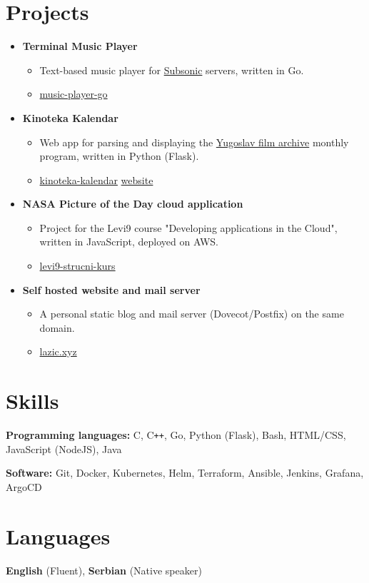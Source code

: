 \documentclass[11pt,a4paper,roman]{moderncv}        %
\begin{document}
\section{Projects}
\begin{itemize}[topsep=0em, itemsep=0pt, itemindent=-1em,font=\huge]
	\item[] \textbf{Terminal Music Player}
		\begin{itemize}[noitemsep,itemindent=-1.25em,topsep=0pt]
			\item[] Text-based music player for \href{http://www.subsonic.org}{Subsonic} servers, written in Go.
			\item[] \faGithub \href{https://github.com/vojislav/music-player-go/}{ music-player-go}
	 	\end{itemize}

	\item[] \textbf{Kinoteka Kalendar}
		\begin{itemize}[noitemsep,itemindent=-1.25em,topsep=0pt]
			\item[] Web app for parsing and displaying the \href{http://kinoteka.org.rs}{Yugoslav film archive} monthly program, written in Python (Flask).
			\item[] \faGithub \href{https://github.com/vojislav/kinoteka-kalendar}{ kinoteka-kalendar} \faGlobe \href{https://kinoteka.lazic.xyz}{ website}
	 	\end{itemize}

	 \item[] \textbf{NASA Picture of the Day cloud application}
	 	\begin{itemize}[noitemsep,itemindent=-1.25em,topsep=0pt]
	 		\item[] Project for the Levi9 course "Developing applications in the Cloud", written in JavaScript, deployed on AWS.
	 		\item[] \faGithub \href{https://github.com/vojislav/levi9-strucni-kurs}{ levi9-strucni-kurs}
	 	\end{itemize}

	\item[] \textbf{Self hosted website and mail server}
		\begin{itemize}[noitemsep,itemindent=-1.25em,topsep=0pt]
			\item[] A personal static blog and mail server (Dovecot/Postfix) on the same domain.
			\item[] \faGlobe \href{https://lazic.xyz}{ lazic.xyz}
	 	\end{itemize}
\end{itemize}

\section{Skills}
\textbf{Programming languages:} C, C\texttt{+}\texttt{+}, Go, Python (Flask), Bash, HTML/CSS, JavaScript (NodeJS), Java

\textbf{Software:} Git, Docker, Kubernetes, Helm, Terraform, Ansible, Jenkins, Grafana, ArgoCD

\section{Languages}
	\textbf{English} (Fluent), \textbf{Serbian} (Native speaker)
\end{document}
